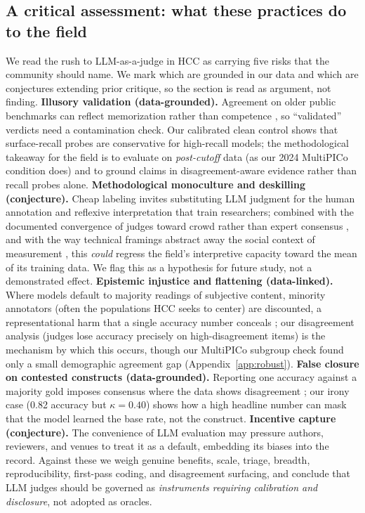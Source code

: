 \subsection{A critical assessment: what these practices do to the field}
We read the rush to LLM-as-a-judge in HCC as carrying five risks that the community should name. We mark which are
grounded in our data and which are conjectures extending prior critique, so the section is read as argument, not
finding.
\textbf{Illusory validation (data-grounded).} Agreement on older public benchmarks can reflect memorization rather
than competence \citep{bender2021parrots}, so ``validated'' verdicts need a contamination check. Our calibrated clean
control shows that surface-recall probes are conservative for high-recall models; the methodological takeaway for the
field is to evaluate on \emph{post-cutoff} data (as our 2024 MultiPICo condition does) and to ground claims in
disagreement-aware evidence rather than recall probes alone.
\textbf{Methodological monoculture and deskilling (conjecture).} Cheap labeling invites substituting LLM judgment for
the human annotation and reflexive interpretation that train researchers; combined with the documented convergence of
judges toward crowd rather than expert consensus \citep{bavaresco2024judgebench}, and with the way technical
framings abstract away the social context of measurement \citep{selbst2019abstraction,suchman2007humanmachine}, this
\emph{could} regress the field's interpretive capacity toward the mean of its training data. We flag this as a
hypothesis for future study, not a demonstrated effect.
\textbf{Epistemic injustice and flattening (data-linked).} Where models default to majority readings of subjective
content, minority annotators (often the populations HCC seeks to center) are discounted, a representational harm that
a single accuracy number conceals \citep{fricker2007epistemic,birhane2022values}; our disagreement analysis
(judges lose accuracy precisely on high-disagreement items) is the mechanism by which this occurs, though our
MultiPICo subgroup check found only a small demographic agreement gap (Appendix~\ref{app:robust}).
\textbf{False closure on contested constructs (data-grounded).} Reporting one accuracy against a majority gold
imposes consensus where the data shows disagreement \citep{aroyo2015truth,plank2022humanlabel}; our irony case
(0.82 accuracy but $\kappa{=}0.40$) shows how a high headline number can mask that the model learned the base rate,
not the construct.
\textbf{Incentive capture (conjecture).} The convenience of LLM evaluation may pressure authors, reviewers, and
venues to treat it as a default, embedding its biases into the record. Against these we weigh genuine benefits,
scale, triage, breadth, reproducibility, first-pass coding, and disagreement surfacing, and conclude that LLM judges
should be governed as \emph{instruments requiring calibration and disclosure}, not adopted as oracles.

